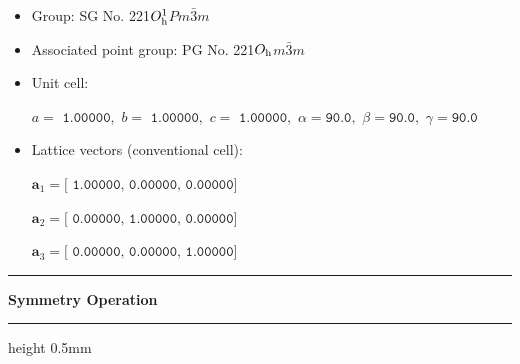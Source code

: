 \documentclass[fleqn,10pt,landscape]{jsarticle}
\begin{document}
\begin{itemize}
\item Group: SG No. 221\quad$O_{\rm h}^{1}$\quad$Pm\bar{3}m$\quad[ cubic ]
\item Associated point group: PG No. 221\quad$O_{\rm h}$\quad$m\bar{3}m$\quad[ cubic ]
\end{itemize}
\begin{itemize}
\item Unit cell:

\quad $a=\texttt{ 1.00000},\,\, b=\texttt{ 1.00000},\,\, c=\texttt{ 1.00000},\,\, \alpha=\texttt{90.0},\,\, \beta=\texttt{90.0},\,\, \gamma=\texttt{90.0}$

\item Lattice vectors (conventional cell):

\quad $\bm{a}_1=\texttt{[ 1.00000, 0.00000, 0.00000]}$

\quad $\bm{a}_2=\texttt{[ 0.00000, 1.00000, 0.00000]}$

\quad $\bm{a}_3=\texttt{[ 0.00000, 0.00000, 1.00000]}$

\end{itemize}
\vspace{5mm}
\noindent \rule[0.5mm]{5mm}{0.5mm}\hspace{3mm}\textbf{Symmetry Operation}\hspace{3mm}\leaders\hrule height 0.5mm\hfill\kern0pt
\vspace{3mm}
\end{document}
